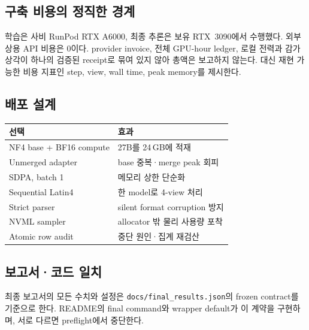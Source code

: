 \documentclass[9pt,a4paper]{extarticle}
\newcommand{\code}[1]{\texttt{\footnotesize #1}}
\begin{document}
\begin{multicols}{2}
\subsection{구축 비용의 정직한 경계}

학습은 사비 RunPod RTX A6000, 최종 추론은 보유 RTX~3090에서 수행했다.
외부 상용 API 비용은 0이다. provider invoice, 전체 GPU-hour ledger, 로컬 전력과
감가상각이 하나의 검증된 receipt로 묶여 있지 않아 총액은 보고하지 않는다.
대신 재현 가능한 비용 지표인 step, view, wall time, peak memory를 제시한다.

\subsection{배포 설계}

\begin{tabularx}{\linewidth}{@{}Y Y@{}}
\toprule
선택 & 효과\\
\midrule
NF4 base + BF16 compute & 27B를 24\,GB에 적재\\
Unmerged adapter & base 중복·merge peak 회피\\
SDPA, batch 1 & 메모리 상한 단순화\\
Sequential Latin4 & 한 model로 4-view 처리\\
Strict parser & silent format corruption 방지\\
NVML sampler & allocator 밖 물리 사용량 포착\\
Atomic row audit & 중단 원인·집계 재검산\\
\bottomrule
\end{tabularx}

\subsection{보고서·코드 일치}

최종 보고서의 모든 수치와 설정은 \code{docs/final\_results.json}의 frozen
contract를 기준으로 한다. README의 final command와 wrapper default가 이 계약을
구현하며, 서로 다르면 preflight에서 중단한다.
\end{multicols}

\newpage
\end{document}
